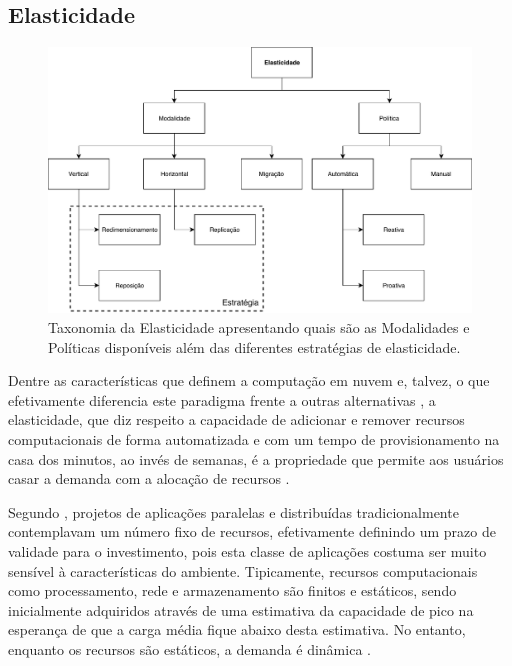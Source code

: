\documentclass[english,brazilian]{UNISINOSmonografia} %
\newcommand\defaultFigureWidth{0.9}
\begin{document}
\subsection{Elasticidade}
\label{sec:elasticidade}

\begin{figure}[tb]
	\centering%
	\begin{minipage}{\defaultFigureWidth\textwidth}
		\caption{Taxonomia da Elasticidade apresentando quais são as Modalidades e Políticas disponíveis além das diferentes estratégias de elasticidade.}
		\label{fig:elasticidade-taxonomia}
		\vspace{1ex}
		\includegraphics[clip,width=\textwidth]{AUTOELASTIC-taxonomia}
	\end{minipage}
\end{figure}


Dentre as características que definem a computação em nuvem e, talvez, o que efetivamente diferencia este paradigma frente a outras alternativas \cite{Galante2012}, a elasticidade, que diz respeito a capacidade de adicionar e remover recursos computacionais de forma automatizada e com um tempo de provisionamento na casa dos minutos, ao invés de semanas, é a propriedade que permite aos usuários casar a demanda com a alocação de recursos \cite{Armbrust:EECS-2009-28,Raveendran2011,Imai2012,Suleiman2012}.

Segundo , projetos de aplicações paralelas e distribuídas tradicionalmente contemplavam um número fixo de recursos, efetivamente definindo um prazo de validade para o investimento, pois esta classe de aplicações costuma ser muito sensível à características do ambiente. 
Tipicamente, recursos computacionais como processamento, rede e armazenamento são finitos e estáticos, sendo inicialmente adquiridos através de uma estimativa da capacidade de pico na esperança de que a carga média fique abaixo desta estimativa. No entanto, enquanto os recursos são estáticos, a demanda é dinâmica \cite{Marshall2010}.
\end{document}
